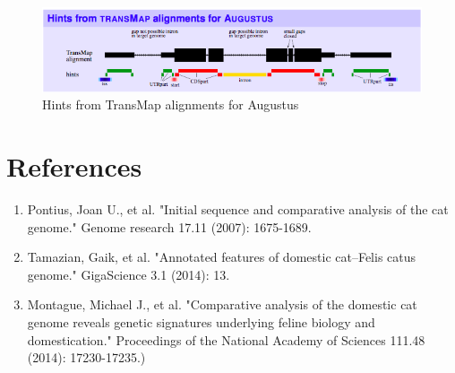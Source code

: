 \documentclass{article}
\begin{document}
\begin{figure}[h]
\centering
\includegraphics[width=\textwidth]{images/hints_from_transmap_to_augustus.png}
\caption{Hints from TransMap alignments for Augustus}
\label{fig:hints_for_augustus}
\end{figure}


\section{References}

\begin{enumerate}
\item Pontius, Joan U., et al. "Initial sequence and comparative analysis of the cat genome." Genome research 17.11 (2007): 1675-1689.
\item Tamazian, Gaik, et al. "Annotated features of domestic cat–Felis catus genome." GigaScience 3.1 (2014): 13.
\item Montague, Michael J., et al. "Comparative analysis of the domestic cat genome reveals genetic signatures underlying feline biology and domestication." Proceedings of the National Academy of Sciences 111.48 (2014): 17230-17235.)
\end{enumerate}
\end{document}

